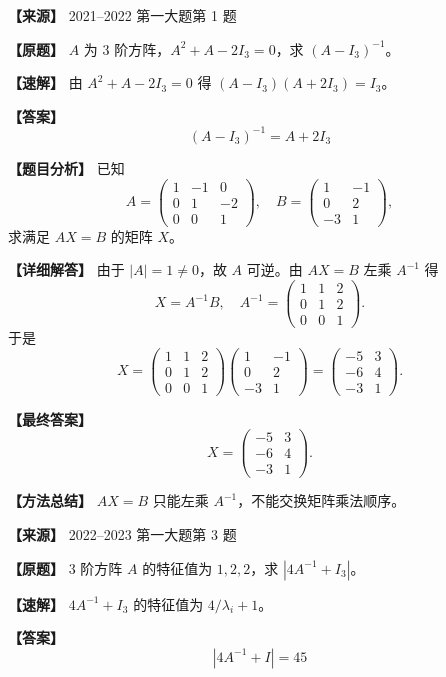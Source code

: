 \documentclass[11pt,a4paper,UTF8]{ctexart}
\begin{document}
\begin{answerbox}
\textbf{【来源】} 2021--2022 第一大题第 1 题

\textbf{【原题】}
$A$ 为 $3$ 阶方阵，$A^2+A-2I_3=0$，求 $(A-I_3)^{-1}$。

\textbf{【速解】}
由 $A^2+A-2I_3=0$ 得 $(A-I_3)(A+2I_3)=I_3$。

\textbf{【答案】}
\[(A-I_3)^{-1}=A+2I_3\]
\end{answerbox}

\begin{answerbox}
\textbf{【题目分析】} 已知
\[
A=\begin{pmatrix}1&-1&0\\0&1&-2\\0&0&1\end{pmatrix},\quad
B=\begin{pmatrix}1&-1\\0&2\\-3&1\end{pmatrix},
\]
求满足 $AX=B$ 的矩阵 $X$。

\textbf{【详细解答】} 由于 $|A|=1\ne0$，故 $A$ 可逆。由 $AX=B$ 左乘 $A^{-1}$ 得
\[
X=A^{-1}B,\quad
A^{-1}=\begin{pmatrix}1&1&2\\0&1&2\\0&0&1\end{pmatrix}.
\]
于是
\[
X=\begin{pmatrix}1&1&2\\0&1&2\\0&0&1\end{pmatrix}
\begin{pmatrix}1&-1\\0&2\\-3&1\end{pmatrix}
=\begin{pmatrix}-5&3\\-6&4\\-3&1\end{pmatrix}.
\]

\textbf{【最终答案】}
\[
X=\begin{pmatrix}-5&3\\-6&4\\-3&1\end{pmatrix}.
\]

\textbf{【方法总结】} $AX=B$ 只能左乘 $A^{-1}$，不能交换矩阵乘法顺序。
\end{answerbox}

\begin{answerbox}
\textbf{【来源】} 2022--2023 第一大题第 3 题

\textbf{【原题】}
$3$ 阶方阵 $A$ 的特征值为 $1,2,2$，求 $|4A^{-1}+I_3|$。

\textbf{【速解】}
$4A^{-1}+I_3$ 的特征值为 $4/\lambda_i+1$。

\textbf{【答案】}
\[|4A^{-1}+I|=45\]
\end{answerbox}
\end{document}
